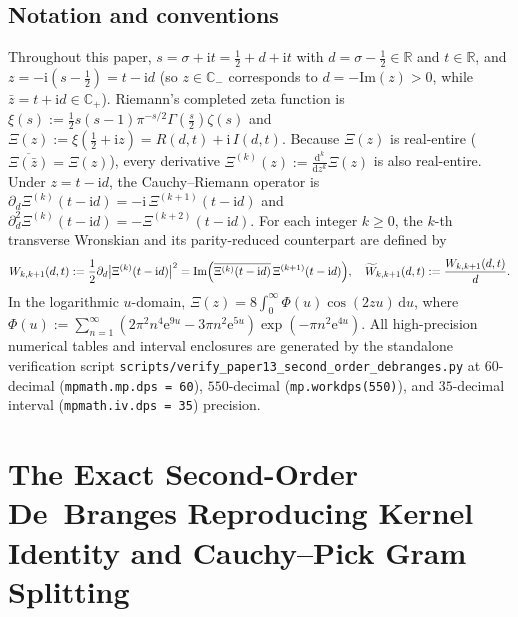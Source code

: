 \documentclass[11pt,reqno]{amsart}
\theoremstyle{definition}
\theoremstyle{remark}
\numberwithin{equation}{section}
\newcommand{\R}{\mathbb{R}}
\newcommand{\C}{\mathbb{C}}
\newcommand{\dd}{\mathrm{d}}
\newcommand{\ee}{\mathrm{e}}
\newcommand{\ii}{\mathrm{i}}
\newcommand{\Ima}{\mathrm{Im}}
\begin{document}
\subsection{Notation and conventions}\label{subsec:notation}

Throughout this paper, $s = \sigma + \ii t = \frac{1}{2} + d + \ii t$ with $d = \sigma - \frac{1}{2} \in \R$ and $t \in \R$, and $z = -\ii(s - \frac{1}{2}) = t - \ii d$ (so $z \in \C_-$ corresponds to $d = -\Ima(z) > 0$, while $\bar{z} = t + \ii d \in \C_+$). Riemann's completed zeta function is $\xi(s) := \frac{1}{2}s(s-1)\pi^{-s/2}\Gamma(\frac{s}{2})\zeta(s)$ and $\Xi(z) := \xi(\frac{1}{2}+\ii z) = R(d,t) + \ii\,I(d,t)$. Because $\Xi(z)$ is real-entire ($\overline{\Xi(\bar{z})} = \Xi(z)$), every derivative $\Xi^{(k)}(z) := \frac{\dd^k}{\dd z^k}\Xi(z)$ is also real-entire. Under $z = t - \ii d$, the Cauchy--Riemann operator is $\partial_d \Xi^{(k)}(t - \ii d) = -\ii\,\Xi^{(k+1)}(t - \ii d)$ and $\partial_d^2 \Xi^{(k)}(t - \ii d) = -\Xi^{(k+2)}(t - \ii d)$. For each integer $k \ge 0$, the $k$-th transverse Wronskian and its parity-reduced counterpart are defined by
\begin{equation}\label{eq:W_k_def}
W_{k,k+1}(d,t) := \frac{1}{2}\partial_d\bigl|\Xi^{(k)}(t - \ii d)\bigr|^2 = \Ima\Bigl(\overline{\Xi^{(k)}(t - \ii d)}\,\Xi^{(k+1)}(t - \ii d)\Bigr), \quad \widetilde{W}_{k,k+1}(d,t) := \frac{W_{k,k+1}(d,t)}{d}.
\end{equation}
In the logarithmic $u$-domain, $\Xi(z) = 8\int_0^\infty \Phi(u)\cos(2zu)\,\dd u$, where $\Phi(u) := \sum_{n=1}^\infty (2\pi^2 n^4 \ee^{9u} - 3\pi n^2 \ee^{5u})\exp(-\pi n^2 \ee^{4u})$. All high-precision numerical tables and interval enclosures are generated by the standalone verification script \texttt{scripts/}\allowbreak\texttt{verify\_paper13\_}\allowbreak\texttt{second\_order\_}\allowbreak\texttt{debranges.py} at $60$-decimal (\texttt{mpmath.mp.dps = 60}), $550$-decimal (\texttt{mp.workdps(550)}), and $35$-decimal interval (\texttt{mpmath.iv.dps = 35}) precision.

\section{The Exact Second-Order De~Branges Reproducing Kernel Identity and Cauchy--Pick Gram Splitting}\label{sec:kernel_split}
\end{document}
